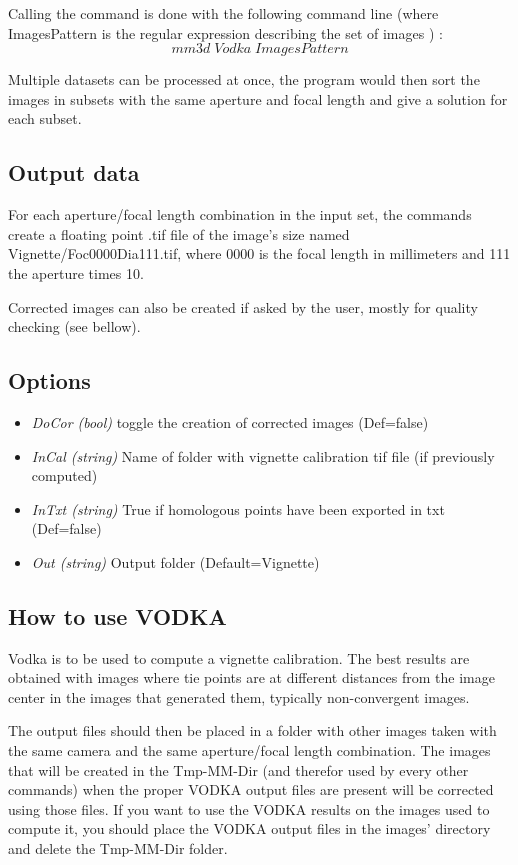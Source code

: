 Calling the command is done with the following command line (where ImagesPattern is the regular expression describing the set of images ) : \[mm3d\;Vodka\;ImagesPattern\]

Multiple datasets can be processed at once, the program would then sort the images in subsets with the same aperture and focal length and give a solution for each subset.

\subsection{Output data}
For each aperture/focal length combination in the input set, the commands create a floating point .tif file of the image's size named Vignette/Foc0000Dia111.tif, where 0000 is the focal length in millimeters and 111 the aperture times 10.


Corrected images can also be created if asked by the user, mostly for quality checking (see bellow).


\subsection{Options}
\begin{itemize}
\item{\textit{DoCor (bool)} toggle the creation of corrected images (Def=false)}
\item{\textit{InCal (string)} Name of folder with vignette calibration tif file (if previously computed)}
\item{\textit{InTxt (string)} True if homologous points have been exported in txt (Def=false)}
\item{\textit{Out (string)} Output folder (Default=Vignette)}
\end{itemize}

\subsection{How to use VODKA}
Vodka is to be used to compute a vignette calibration. The best results are obtained with images where tie points are at different distances from the image center in the images that generated them, typically non-convergent images.


The output files should then be placed in a folder with other images taken with the same camera and the same aperture/focal length combination. The images that will be created in the Tmp-MM-Dir (and therefor used by every other commands) when the proper VODKA output files are present will be corrected using those files. If you want to use the VODKA results on the images used to compute it, you should place the VODKA output files in the images' directory and delete the Tmp-MM-Dir folder.

